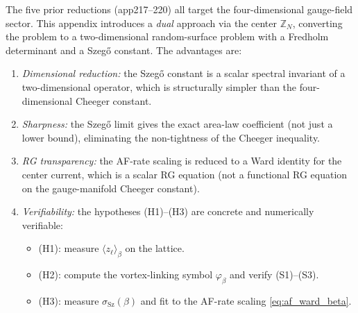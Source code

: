 \begin{remark}
\label{rem:cv_advance}
The five prior reductions (app217--220) all target the
four-dimensional gauge-field sector. This appendix introduces a
\emph{dual} approach via the center $\mathbb{Z}_{N}$, converting
the problem to a two-dimensional random-surface problem with a
Fredholm determinant and a Szeg\H{o} constant. The advantages are:
\begin{enumerate}
\item \emph{Dimensional reduction:} the Szeg\H{o} constant is a
scalar spectral invariant of a two-dimensional operator, which is
structurally simpler than the four-dimensional Cheeger constant.
\item \emph{Sharpness:} the Szeg\H{o} limit gives the exact
area-law coefficient (not just a lower bound), eliminating the
non-tightness of the Cheeger inequality.
\item \emph{RG transparency:} the AF-rate scaling is reduced to a
Ward identity for the center current, which is a scalar RG
equation (not a functional RG equation on the gauge-manifold
Cheeger constant).
\item \emph{Verifiability:} the hypotheses (H1)--(H3) are
concrete and numerically verifiable:
\begin{itemize}
\item (H1): measure $\langle z_{\ell}\rangle_{\beta}$ on the
lattice.
\item (H2): compute the vortex-linking symbol
$\varphi_{\beta}$ and verify (S1)--(S3).
\item (H3): measure $\sigma_{\mathrm{Sz}}(\beta)$ and fit to
the AF-rate scaling \eqref{eq:af_ward_beta}.
\end{itemize}
\end{enumerate}
\end{remark}

